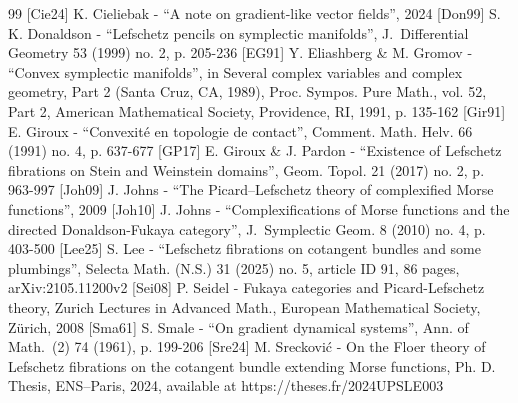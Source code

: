 \documentclass[10pt]{amsart}
\theoremstyle{plain}
\theoremstyle{definition}
\begin{document}
\begin{thebibliography}{99}
 [Cie24] K. Cieliebak - “A note on gradient-like vector fields”, 2024
 [Don99] S. K. Donaldson - “Lefschetz pencils on symplectic manifolds”, J. Differential Geometry 53 (1999) no. 2, p. 205-236
 [EG91] Y. Eliashberg \& M. Gromov - “Convex symplectic manifolds”, in Several complex variables and complex geometry, Part 2 (Santa Cruz, CA, 1989), Proc. Sympos. Pure Math., vol. 52, Part 2, American Mathematical Society, Providence, RI, 1991, p. 135-162
 [Gir91] E. Giroux - “Convexité en topologie de contact”, Comment. Math. Helv. 66 (1991) no. 4, p. 637-677
 [GP17] E. Giroux \& J. Pardon - “Existence of Lefschetz fibrations on Stein and Weinstein domains”, Geom. Topol. 21 (2017) no. 2, p. 963-997
 [Joh09] J. Johns - “The Picard–Lefschetz theory of complexified Morse functions”, 2009
 [Joh10] J. Johns - “Complexifications of Morse functions and the directed Donaldson-Fukaya category”, J. Symplectic Geom. 8 (2010) no. 4, p. 403-500
 [Lee25] S. Lee - “Lefschetz fibrations on cotangent bundles and some plumbings”, Selecta Math. (N.S.) 31 (2025) no. 5, article ID 91, 86 pages, arXiv:2105.11200v2
 [Sei08] P. Seidel - Fukaya categories and Picard-Lefschetz theory, Zurich Lectures in Advanced Math., European Mathematical Society, Zürich, 2008
 [Sma61] S. Smale - “On gradient dynamical systems”, Ann. of Math. (2) 74 (1961), p. 199-206
 [Sre24] M. Srecković - On the Floer theory of Lefschetz fibrations on the cotangent bundle extending Morse functions, Ph. D. Thesis, ENS–Paris, 2024, available at https://theses.fr/2024UPSLE003
\end{thebibliography}
\end{document}
